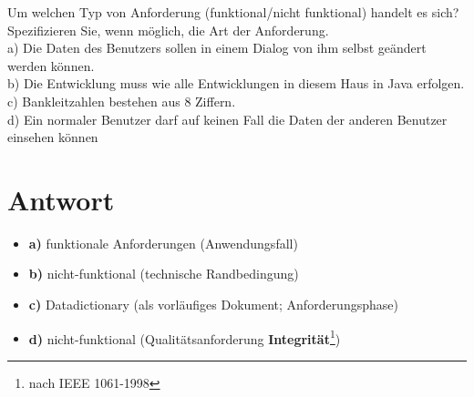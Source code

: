 Um welchen Typ von Anforderung (funktional/nicht funktional) handelt es sich?
Spezifizieren Sie, wenn möglich, die Art der Anforderung.\\
a) Die Daten des Benutzers sollen in einem Dialog von ihm selbst geändert werden
können.\\
b) Die Entwicklung muss wie alle Entwicklungen in diesem Haus in Java erfolgen.\\
c) Bankleitzahlen bestehen aus 8 Ziffern.\\
d) Ein normaler Benutzer darf auf keinen Fall die Daten der anderen Benutzer einsehen können

\section*{Antwort}

\begin{itemize}
    \item \textbf{a)} funktionale Anforderungen (Anwendungsfall)
    \item \textbf{b)} nicht-funktional (technische Randbedingung)
    \item \textbf{c)} Datadictionary (als vorläufiges Dokument; Anforderungsphase)
    \item \textbf{d)} nicht-funktional (Qualitätsanforderung \textbf{Integrität}\footnote{
    nach IEEE 1061-1998
    })
\end{itemize}